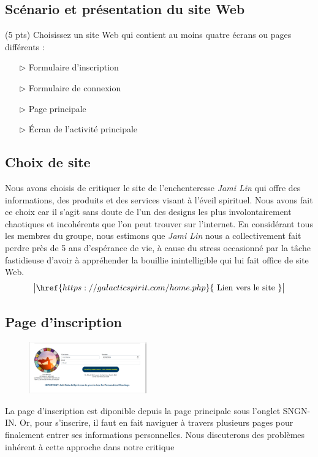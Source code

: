 \documentclass[9pt]{report}
\newcommand{\mathpazott}{\fontfamily{pplj}\selectfont}
\renewcommand{\texttt}[1]{{\scriptsize\mathpazott #1}}
\begin{document}
\begin{multicols*}{2}
  \small
\chapter{Scénario et présentation du site Web}



  \begin{Exercice}{(5 pts)}{}
  Choisissez un site Web qui contient au moins quatre écrans ou pages différents :     
  \begin{itemize}
    \item [$\rhd$ ] Formulaire d’inscription
    \item [$\rhd$ ] Formulaire de connexion  
    \item [$\rhd$ ] Page principale  
    \item [$\rhd$ ] Écran de l'activité principale 
  \end{itemize} 
  \end{Exercice}


  \section{Choix de site}
  Nous avons choisis de critiquer le site de l'enchenteresse \textit{Jami Lin} 
  qui offre des informations, des produits et des services visant à l'éveil 
  spirituel. Nous avons fait ce choix car il s'agit sans doute de l'un des 
  designs les plus involontairement chaotiques et incohérents que l'on peut trouver 
  sur l'internet. En considérant tous les membres du groupe, nous estimons 
  que \textit{Jami Lin}  nous a collectivement fait perdre près de 5 ans d'espérance de vie, 
  à cause du stress occasionné par la tâche fastidieuse d'avoir à appréhender la bouillie 
  inintelligible qui lui fait office de site Web. 
  \[ \big| \href{https://galacticspirit.com/home.php}{\text{ Lien vers le site }}  \big| \]

  \vspace{-1em}

  \section{Page d'inscription}
  \vspace{-2em}
  \begin{figure}[H]
    \begin{center}
      \includegraphics[width=0.45\textwidth]{SinupPage.png}
    \end{center}
  \end{figure}
  \vspace{-2.5em}
  La page d'inscription est diponible depuis la page principale sous l'onglet 
  \texttt{SNGN-IN}. Or, pour s'inscrire, il faut en fait naviguer à travers plusieurs 
  pages pour finalement entrer ses informations personnelles. Nous discuterons 
  des problèmes inhérent à cette approche dans notre critique



\end{multicols*}
\end{document}
